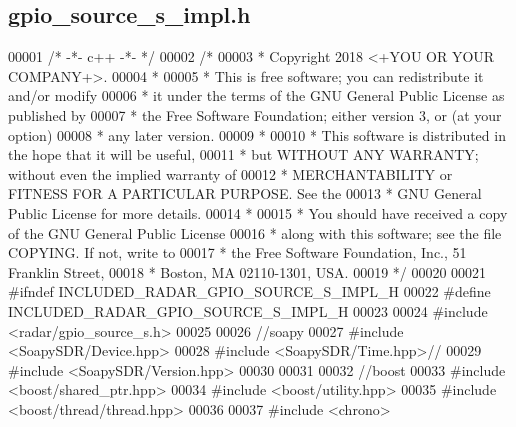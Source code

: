 \subsection{gpio\+\_\+source\+\_\+s\+\_\+impl.\+h}
\label{gpio__source__s__impl_8h_source}

\begin{DoxyCode}
00001 \textcolor{comment}{/* -*- c++ -*- */}
00002 \textcolor{comment}{/*}
00003 \textcolor{comment}{ * Copyright 2018 <+YOU OR YOUR COMPANY+>.}
00004 \textcolor{comment}{ *}
00005 \textcolor{comment}{ * This is free software; you can redistribute it and/or modify}
00006 \textcolor{comment}{ * it under the terms of the GNU General Public License as published by}
00007 \textcolor{comment}{ * the Free Software Foundation; either version 3, or (at your option)}
00008 \textcolor{comment}{ * any later version.}
00009 \textcolor{comment}{ *}
00010 \textcolor{comment}{ * This software is distributed in the hope that it will be useful,}
00011 \textcolor{comment}{ * but WITHOUT ANY WARRANTY; without even the implied warranty of}
00012 \textcolor{comment}{ * MERCHANTABILITY or FITNESS FOR A PARTICULAR PURPOSE.  See the}
00013 \textcolor{comment}{ * GNU General Public License for more details.}
00014 \textcolor{comment}{ *}
00015 \textcolor{comment}{ * You should have received a copy of the GNU General Public License}
00016 \textcolor{comment}{ * along with this software; see the file COPYING.  If not, write to}
00017 \textcolor{comment}{ * the Free Software Foundation, Inc., 51 Franklin Street,}
00018 \textcolor{comment}{ * Boston, MA 02110-1301, USA.}
00019 \textcolor{comment}{ */}
00020 
00021 \textcolor{preprocessor}{#ifndef INCLUDED\_RADAR\_GPIO\_SOURCE\_S\_IMPL\_H}
00022 \textcolor{preprocessor}{#define INCLUDED\_RADAR\_GPIO\_SOURCE\_S\_IMPL\_H}
00023 
00024 \textcolor{preprocessor}{#include <radar/gpio_source_s.h>}
00025 
00026 \textcolor{comment}{//soapy}
00027 \textcolor{preprocessor}{#include <SoapySDR/Device.hpp>}
00028 \textcolor{preprocessor}{#include <SoapySDR/Time.hpp>}\textcolor{comment}{//}
00029 \textcolor{preprocessor}{#include <SoapySDR/Version.hpp>}
00030 
00031 
00032 \textcolor{comment}{//boost}
00033 \textcolor{preprocessor}{#include <boost/shared\_ptr.hpp>}
00034 \textcolor{preprocessor}{#include <boost/utility.hpp>}
00035 \textcolor{preprocessor}{#include <boost/thread/thread.hpp>}
00036 
00037 \textcolor{preprocessor}{#include <chrono>}

\end{DoxyCode}

